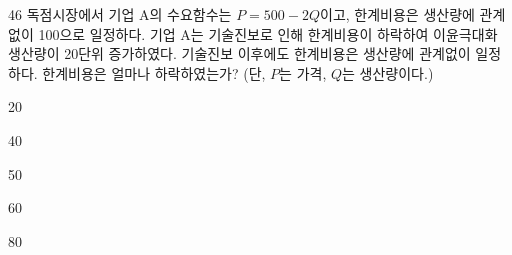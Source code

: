 \begin{question}{46}
독점시장에서 기업 A의 수요함수는 ${ P=500-2Q }$이고, 한계비용은 생산량에 관계없이 100으로 일정하다. 기업 A는 기술진보로 인해 한계비용이 하락하여 이윤극대화 생산량이 20단위 증가하였다. 기술진보 이후에도 한계비용은 생산량에 관계없이 일정하다. 한계비용은 얼마나 하락하였는가? (단, ${ P }$는 가격, ${ Q }$는 생산량이다.)
\begin{choices}
  \item 20
  \item 40
  \item 50
  \item 60
  \item 80
\end{choices}
\end{question}
